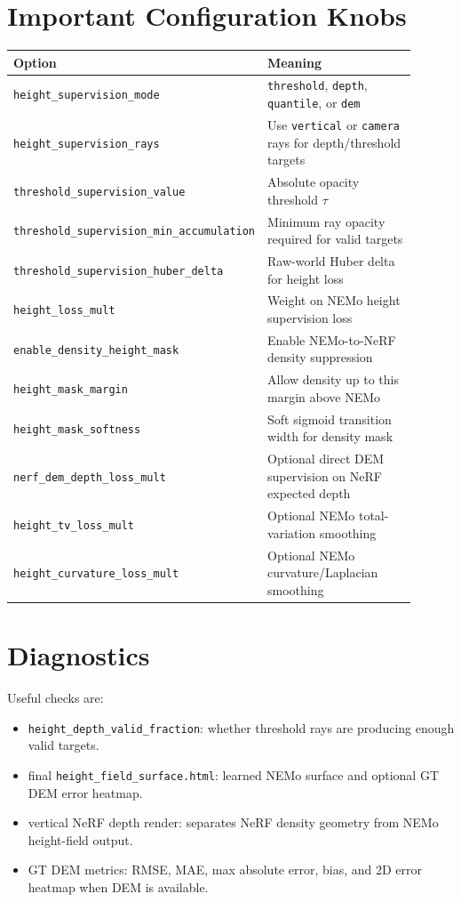 \documentclass[11pt]{article}
\begin{document}
\section{Important Configuration Knobs}

\begin{center}
{\footnotesize
\begin{tabular}{p{0.52\linewidth}p{0.38\linewidth}}
\toprule
Option & Meaning \\
\midrule
\texttt{height\_supervision\_mode} & \texttt{threshold}, \texttt{depth}, \texttt{quantile}, or \texttt{dem} \\
\texttt{height\_supervision\_rays} & Use \texttt{vertical} or \texttt{camera} rays for depth/threshold targets \\
\texttt{threshold\_supervision\_value} & Absolute opacity threshold \(\tau\) \\
\texttt{threshold\_supervision\_min\_accumulation} & Minimum ray opacity required for valid targets \\
\texttt{threshold\_supervision\_huber\_delta} & Raw-world Huber delta for height loss \\
\texttt{height\_loss\_mult} & Weight on NEMo height supervision loss \\
\texttt{enable\_density\_height\_mask} & Enable NEMo-to-NeRF density suppression \\
\texttt{height\_mask\_margin} & Allow density up to this margin above NEMo \\
\texttt{height\_mask\_softness} & Soft sigmoid transition width for density mask \\
\texttt{nerf\_dem\_depth\_loss\_mult} & Optional direct DEM supervision on NeRF expected depth \\
\texttt{height\_tv\_loss\_mult} & Optional NEMo total-variation smoothing \\
\texttt{height\_curvature\_loss\_mult} & Optional NEMo curvature/Laplacian smoothing \\
\bottomrule
\end{tabular}
}
\end{center}

\section{Diagnostics}

Useful checks are:

\begin{itemize}[leftmargin=*]
  \item \texttt{height\_depth\_valid\_fraction}: whether threshold rays are producing enough valid targets.
  \item final \texttt{height\_field\_surface.html}: learned NEMo surface and optional GT DEM error heatmap.
  \item vertical NeRF depth render: separates NeRF density geometry from NEMo height-field output.
  \item GT DEM metrics: RMSE, MAE, max absolute error, bias, and 2D error heatmap when DEM is available.
\end{itemize}
\end{document}
